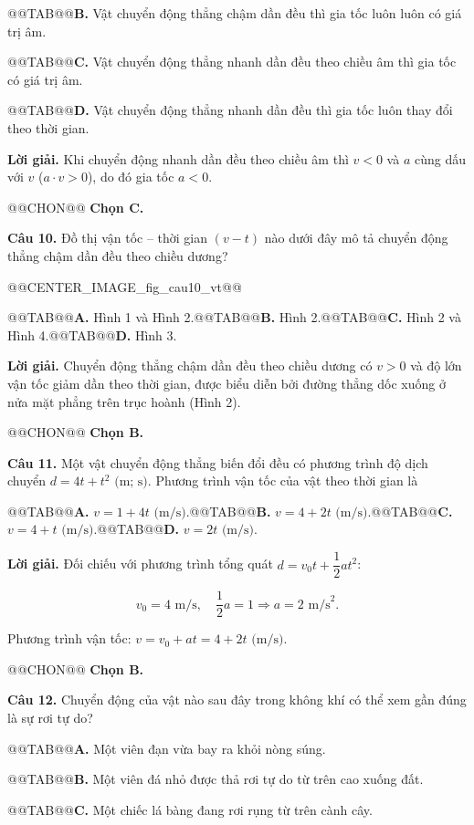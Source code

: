 \documentclass{article}
\begin{document}
@@TAB@@\textbf{B.} Vật chuyển động thẳng chậm dần đều thì gia tốc luôn luôn có giá trị âm.

@@TAB@@\textbf{C.} Vật chuyển động thẳng nhanh dần đều theo chiều âm thì gia tốc có giá trị âm.

@@TAB@@\textbf{D.} Vật chuyển động thẳng nhanh dần đều thì gia tốc luôn thay đổi theo thời gian.

\textbf{Lời giải.} Khi chuyển động nhanh dần đều theo chiều âm thì $v < 0$ và $a$ cùng dấu với $v$ ($a \cdot v > 0$), do đó gia tốc $a < 0$.

@@CHON@@ \textbf{Chọn C.}

\textbf{Câu 10.} Đồ thị vận tốc -- thời gian $(v - t)$ nào dưới đây mô tả chuyển động thẳng chậm dần đều theo chiều dương?

@@CENTER_IMAGE_fig_cau10_vt@@

@@TAB@@\textbf{A.} Hình 1 và Hình 2.@@TAB@@\textbf{B.} Hình 2.@@TAB@@\textbf{C.} Hình 2 và Hình 4.@@TAB@@\textbf{D.} Hình 3.

\textbf{Lời giải.} Chuyển động thẳng chậm dần đều theo chiều dương có $v > 0$ và độ lớn vận tốc giảm dần theo thời gian, được biểu diễn bởi đường thẳng dốc xuống ở nửa mặt phẳng trên trục hoành (Hình 2).

@@CHON@@ \textbf{Chọn B.}

\textbf{Câu 11.} Một vật chuyển động thẳng biến đổi đều có phương trình độ dịch chuyển $d = 4t + t^2\text{ (m; s)}$. Phương trình vận tốc của vật theo thời gian là

@@TAB@@\textbf{A.} $v = 1 + 4t\text{ (m/s)}$.@@TAB@@\textbf{B.} $v = 4 + 2t\text{ (m/s)}$.@@TAB@@\textbf{C.} $v = 4 + t\text{ (m/s)}$.@@TAB@@\textbf{D.} $v = 2t\text{ (m/s)}$.

\textbf{Lời giải.} Đối chiếu với phương trình tổng quát $d = v_0 t + \dfrac{1}{2}at^2$:

\[v_0 = 4\text{ m/s}, \quad \frac{1}{2}a = 1 \Rightarrow a = 2\text{ m/s}^2.\]

Phương trình vận tốc: $v = v_0 + at = 4 + 2t\text{ (m/s)}$.

@@CHON@@ \textbf{Chọn B.}

\textbf{Câu 12.} Chuyển động của vật nào sau đây trong không khí có thể xem gần đúng là sự rơi tự do?

@@TAB@@\textbf{A.} Một viên đạn vừa bay ra khỏi nòng súng.

@@TAB@@\textbf{B.} Một viên đá nhỏ được thả rơi tự do từ trên cao xuống đất.

@@TAB@@\textbf{C.} Một chiếc lá bàng đang rơi rụng từ trên cành cây.
\end{document}
